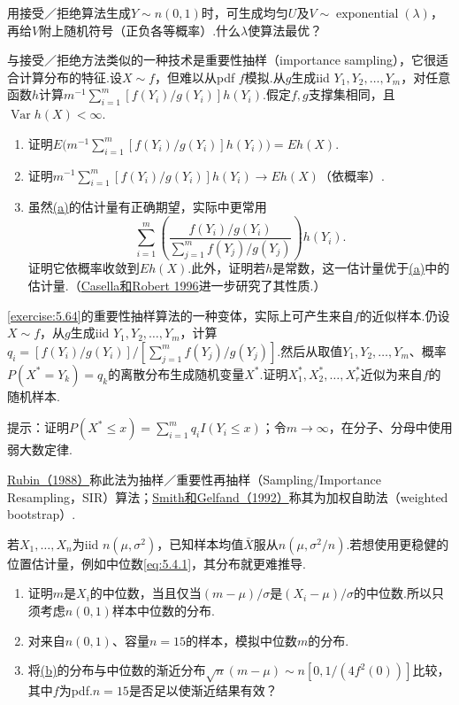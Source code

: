 \begin{exercise}\label{exercise:5.63}
用接受／拒绝算法生成$Y\sim n(0,1)$时，可生成均匀$U$及$V\sim\operatorname{exponential}(\lambda)$，再给$V$附上随机符号（正负各等概率）.什么$\lambda$使算法最优？
\end{exercise}
\begin{exercise}\label{exercise:5.64}
与接受／拒绝方法类似的一种技术是重要性抽样（importance sampling），它很适合计算分布的特征.设$X\sim f$，但难以从pdf $f$模拟.从$g$生成iid $Y_1,Y_2,\ldots,Y_m$，对任意函数$h$计算$m^{-1}\sum_{i=1}^m[f(Y_i)/g(Y_i)]h(Y_i)$.假定$f,g$支撑集相同，且$\operatorname{Var}h(X)<\infty$.
\begin{enumerate}[label=(\alph*)]
\item{}\label{itm:exercise:5.64:a} 证明$E\bigl(m^{-1}\sum_{i=1}^m[f(Y_i)/g(Y_i)]h(Y_i)\bigr)=Eh(X)$.
\item 证明$m^{-1}\sum_{i=1}^m[f(Y_i)/g(Y_i)]h(Y_i)\to Eh(X)$（依概率）.
\item 虽然\hyperref[itm:exercise:5.64:a]{(a)}的估计量有正确期望，实际中更常用
$$\sum_{i=1}^m\left(\frac{f(Y_i)/g(Y_i)}{\sum_{j=1}^m f(Y_j)/g(Y_j)}\right)h(Y_i).$$
证明它依概率收敛到$Eh(X)$.此外，证明若$h$是常数，这一估计量优于\hyperref[itm:exercise:5.64:a]{(a)}中的估计量.（\hyperref[bib:source70]{Casella和Robert 1996}进一步研究了其性质.）
\end{enumerate}
\end{exercise}
\begin{exercise}\label{exercise:5.65}
\autoref{exercise:5.64}的重要性抽样算法的一种变体，实际上可产生来自$f$的近似样本.仍设$X\sim f$，从$g$生成iid $Y_1,Y_2,\ldots,Y_m$，计算$q_i=[f(Y_i)/g(Y_i)]/[\sum_{j=1}^mf(Y_j)/g(Y_j)]$.然后从取值$Y_1,Y_2,\ldots,Y_m$、概率$P(X^*=Y_k)=q_k$的离散分布生成随机变量$X^*$.证明$X_1^*,X_2^*,\ldots,X_r^*$近似为来自$f$的随机样本.

提示：证明$P(X^*\le x)=\sum_{i=1}^m q_iI(Y_i\le x)$；令$m\to\infty$，在分子、分母中使用弱大数定律.

\hyperref[bib:source266]{Rubin（1988）}称此法为抽样／重要性再抽样（Sampling/Importance Resampling，SIR）算法；\hyperref[bib:source292]{Smith和Gelfand（1992）}称其为加权自助法（weighted bootstrap）.
\end{exercise}
\begin{exercise}\label{exercise:5.66}
若$X_1,\ldots,X_n$为iid $n(\mu,\sigma^2)$，已知样本均值$\bar X$服从$n(\mu,\sigma^2/n)$.若想使用更稳健的位置估计量，例如中位数\eqref{eq:5.4.1}，其分布就更难推导.
\begin{enumerate}[label=(\alph*)]
\item 证明$m$是$X_i$的中位数，当且仅当$(m-\mu)/\sigma$是$(X_i-\mu)/\sigma$的中位数.所以只须考虑$n(0,1)$样本中位数的分布.
\item{}\label{itm:exercise:5.66:b} 对来自$n(0,1)$、容量$n=15$的样本，模拟中位数$m$的分布.
\item 将\hyperref[itm:exercise:5.66:b]{(b)}的分布与中位数的渐近分布$\sqrt n(m-\mu)\sim n[0,1/(4f^2(0))]$比较，其中$f$为pdf.$n=15$是否足以使渐近结果有效？
\end{enumerate}
\end{exercise}
